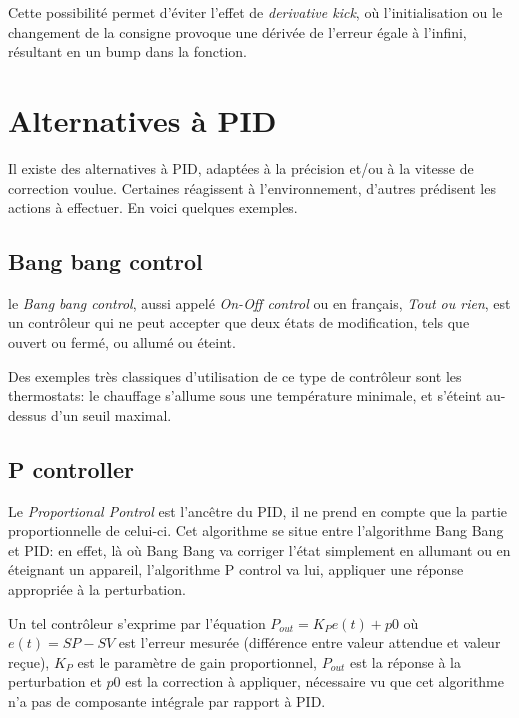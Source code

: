 Cette possibilité permet d'éviter l'effet de \emph{derivative kick}, où l'initialisation ou le changement de la consigne provoque une dérivée de l'erreur égale à l'infini, résultant en un bump dans la fonction.




\section{Alternatives à PID}
Il existe des alternatives à PID, adaptées à la précision et/ou à la vitesse de correction voulue. Certaines réagissent à l'environnement, d'autres prédisent les actions à effectuer. En voici quelques exemples.

\subsection{Bang bang control}
le \emph{Bang bang control}, aussi appelé \emph{On-Off control} ou en français, \emph{Tout ou rien}, est un contrôleur qui ne peut accepter que deux états de modification, tels que ouvert ou fermé, ou allumé ou éteint.

Des exemples très classiques d'utilisation de ce type de contrôleur sont les thermostats: le chauffage s'allume sous une température minimale, et s'éteint au-dessus d'un seuil maximal.

\subsection{P controller}
Le \emph{Proportional Pontrol} est l'ancêtre du PID, il ne prend en compte que la partie proportionnelle de celui-ci.
Cet algorithme se situe entre l'algorithme Bang Bang et PID:
en effet, là où Bang Bang va corriger l'état simplement en allumant ou en éteignant un appareil, l'algorithme P control va lui, appliquer une réponse appropriée à la perturbation.

Un tel contrôleur s'exprime par l'équation $P_{out} = K_{P}e(t) + p0$ où $e(t) = SP - SV$ est l'erreur mesurée (différence entre valeur attendue et valeur reçue), $K_{P}$ est le paramètre de gain proportionnel, $P_{out}$ est la réponse à la perturbation et $p0$ est la correction à appliquer, nécessaire vu que cet algorithme n'a pas de composante intégrale par rapport à PID.

